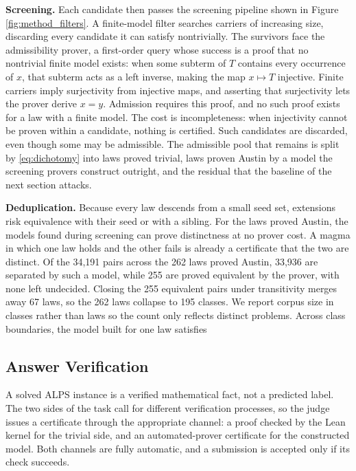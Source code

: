 \documentclass[letterpaper]{article} %
\begin{document}
\textbf{Screening.} Each candidate then passes the screening pipeline shown in Figure \ref{fig:method_filters}. A finite-model filter searches carriers of increasing size, discarding every candidate it can satisfy nontrivially. The survivors face the admissibility prover, a first-order query whose success is a proof that no nontrivial finite model exists: when some subterm of $T$ contains every occurrence of $x$, that subterm acts as a left inverse, making the map $x \mapsto T$ injective. Finite carriers imply surjectivity from injective maps, and asserting that surjectivity lets the prover derive $x = y$. Admission requires this proof, and no such proof exists for a law with a finite model. The cost is incompleteness: when injectivity cannot be proven within a candidate, nothing is certified. Such candidates are discarded, even though some may be admissible. The admissible pool that remains is split by \eqref{eq:dichotomy} into laws proved trivial, laws proven Austin by a model the screening provers construct outright, and the residual that the baseline of the next section attacks. 

\textbf{Deduplication.} Because every law descends from a small seed set, extensions risk equivalence with their seed or with a sibling. For the laws proved Austin, the models found during screening can prove distinctness at no prover cost. A magma in which one law holds and the other fails is already a certificate that the two are distinct. Of the 34,191 pairs across the 262 laws proved Austin, 33,936 are separated by such a model, while 255 are proved equivalent by the prover, with none left undecided. Closing the 255 equivalent pairs under transitivity merges away 67 laws, so the 262 laws collapse to 195 classes. We report corpus size in classes rather than laws so the count only reflects distinct problems. Across class boundaries, the model built for one law satisfies 

\subsection{Answer Verification}

A solved ALPS instance is a verified mathematical fact, not a predicted label. The two sides of the task call for different verification processes, so the judge issues a certificate through the appropriate channel: a proof checked by the Lean kernel for the trivial side, and an automated-prover certificate for the constructed model. Both channels are fully automatic, and a submission is accepted only if its check succeeds. 
\end{document}
